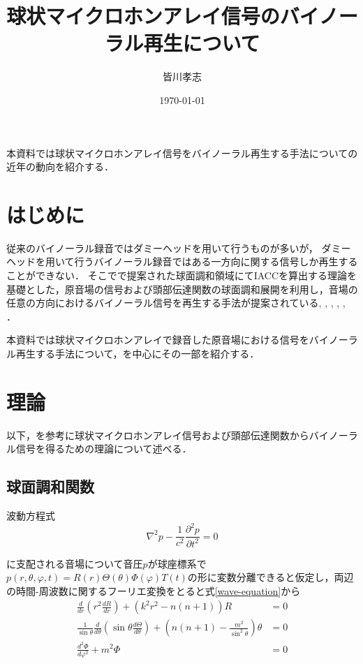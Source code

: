 \documentclass[a4paper]{jsarticle}
\begin{document}
\title{球状マイクロホンアレイ信号のバイノーラル再生について}
\author{皆川孝志}
\date{\today}
\maketitle

本資料では球状マイクロホンアレイ信号をバイノーラル再生する手法についての近年の動向を紹介する．

\section{はじめに}
従来のバイノーラル録音ではダミーヘッドを用いて行うものが多いが，
ダミーヘッドを用いて行うバイノーラル録音ではある一方向に関する信号しか再生することができない．
そこで\cite{Rafaely2010-ea}で提案された球面調和領域にてIACCを算出する理論を基礎とした，原音場の信号および頭部伝達関数の球面調和展開を利用し，音場の任意の方向におけるバイノーラル信号を再生する手法が提案されている\cite{Andersson_undated-qg}, \cite{Noisternig2003-ug}, \cite{Otani2020-cg}, \cite{Schorkhuber2018-ql}, \cite{Sheaffer2014-bo}, \cite{Zaunschirm2018-mn}．

本資料では球状マイクロホンアレイで録音した原音場における信号をバイノーラル再生する手法について，\cite{Andersson_undated-qg}を中心にその一部を紹介する．

\section{理論}
以下，\cite{Andersson_undated-qg}を参考に球状マイクロホンアレイ信号および頭部伝達関数からバイノーラル信号を得るための理論について述べる．

\subsection{球面調和関数}
波動方程式
\begin{equation}
    \label{wave-equation}
    \nabla^{2} p-\frac{1}{c^{2}} \frac{\partial^{2} p}{\partial t^{2}}=0
\end{equation}

に支配される音場について音圧$p$が球座標系で$p(r, \theta, \varphi, t) = R(r) \Theta(\theta) \Phi(\varphi) T(t) $の形に変数分離できると仮定し，両辺の時間-周波数に関するフーリエ変換をとると式\ref{wave-equation}から
\begin{align*}
    \frac{d}{d r}\left(r^{2} \frac{d R}{d r}\right)+\left(k^{2} r^{2}-n(n+1)\right) R                                                                    & =0 \\
    \frac{1}{\sin \theta} \frac{d}{d \theta}\left(\sin \theta \frac{d \Theta}{d \theta}\right)+\left(n(n+1)-\frac{m^{2}}{\sin ^{2} \theta}\right) \theta & =0 \\
    \frac{d^{2} \Phi}{d \varphi^{2}}+m^{2} \Phi                                                                                                          & =0
\end{align*}
\end{document}
